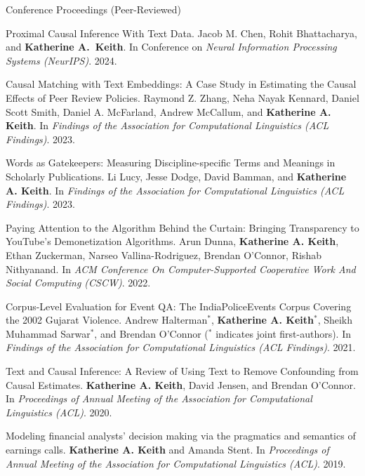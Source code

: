\documentclass{resume} %
\begin{document}
\begin{rSection}{Conference Proceedings (Peer-Reviewed)}
\begin{etaremune}

\item Proximal Causal Inference With Text Data.
    Jacob M. Chen, Rohit Bhattacharya, and \textbf{Katherine A.~Keith}.
    In  Conference on \emph{Neural Information Processing Systems (NeurIPS)}. 2024. 

\item Causal Matching with Text Embeddings: A Case Study in Estimating the Causal Effects of Peer Review Policies.
    Raymond Z. Zhang, Neha Nayak Kennard, 
    Daniel Scott Smith, Daniel A. McFarland, 
    Andrew McCallum, and \textbf{Katherine A. Keith}.
    In \emph{Findings of the Association for Computational Linguistics (ACL Findings)}. 2023.

\item Words as Gatekeepers: Measuring Discipline-specific
    Terms and Meanings in Scholarly Publications.
    Li Lucy, Jesse Dodge, David Bamman, and \textbf{Katherine A. Keith}.
    In \emph{Findings of the Association for Computational Linguistics (ACL Findings)}. 2023.

\item Paying Attention to the Algorithm Behind the Curtain: Bringing Transparency to YouTube's Demonetization Algorithms.
    Arun Dunna, \textbf{Katherine A. Keith}, Ethan Zuckerman, Narseo Vallina-Rodriguez, Brendan O'Connor, Rishab Nithyanand. 
    In \emph{ACM Conference On Computer-Supported Cooperative Work And Social Computing (CSCW)}. 2022. 

\item Corpus-Level Evaluation for Event QA: The IndiaPoliceEvents Corpus Covering the 2002 Gujarat Violence. Andrew Halterman$^*$, \textbf{Katherine A. Keith}$^*$, Sheikh Muhammad Sarwar$^*$, and Brendan O'Connor ($^*$ indicates joint first-authors).  In \emph{Findings of the Association for Computational Linguistics (ACL Findings)}. 2021.

\item Text and Causal Inference: A Review of Using Text to Remove Confounding from Causal Estimates. \textbf{Katherine A. Keith}, David Jensen, and Brendan O'Connor. In \emph{Proceedings of Annual Meeting of the Association for Computational Linguistics (ACL)}. 2020.  

\item Modeling financial analysts' decision making via the pragmatics and semantics of earnings calls. 
\textbf{Katherine A. Keith} and Amanda Stent. 
In \emph{Proceedings of Annual Meeting of the Association for Computational Linguistics (ACL)}.  2019. 


\end{etaremune}
\end{rSection}
\end{document}
